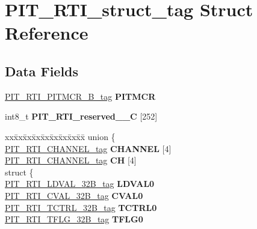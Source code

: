 \hypertarget{structPIT__RTI__struct__tag}{}\section{P\+I\+T\+\_\+\+R\+T\+I\+\_\+struct\+\_\+tag Struct Reference}
\label{structPIT__RTI__struct__tag}
\subsection*{Data Fields}
\begin{DoxyCompactItemize}
\item 
\mbox{\label{structPIT__RTI__struct__tag_a57e87d6540fea4c0d5953554ebdda89d}} 
\mbox{\hyperlink{unionPIT__RTI__PITMCR__32B__tag}{P\+I\+T\+\_\+\+R\+T\+I\+\_\+\+P\+I\+T\+M\+C\+R\+\_\+B\+\_\+tag}} {\bfseries P\+I\+T\+M\+CR}
\item 
\mbox{\label{structPIT__RTI__struct__tag_a6ff8f9b0ae852d101da16b78228c33b9}} 
int8\+\_\+t {\bfseries P\+I\+T\+\_\+\+R\+T\+I\+\_\+reserved\+\_\+\_\+C} \mbox{[}252\mbox{]}
\item 
\mbox{\label{structPIT__RTI__struct__tag_a1cb68ad21449772834486330bcc8e533}} 
\begin{tabbing}
xx\=xx\=xx\=xx\=xx\=xx\=xx\=xx\=xx\=\kill
union \{\\
\>\mbox{\hyperlink{structPIT__RTI__CHANNEL__struct__tag}{PIT\_RTI\_CHANNEL\_tag}} {\bfseries CHANNEL} \mbox{[}4\mbox{]}\\
\>\mbox{\hyperlink{structPIT__RTI__CHANNEL__struct__tag}{PIT\_RTI\_CHANNEL\_tag}} {\bfseries CH} \mbox{[}4\mbox{]}\\
\mbox{\label{unionPIT__RTI__struct__tag_1_1_0D1740_a6cdea62a5904fed77b8dd86c7295d783}} 
\>struct \{\\
\>\>\mbox{\hyperlink{unionPIT__RTI__LDVAL__32B__tag}{PIT\_RTI\_LDVAL\_32B\_tag}} {\bfseries LDVAL0}\\
\>\>\mbox{\hyperlink{unionPIT__RTI__CVAL__32B__tag}{PIT\_RTI\_CVAL\_32B\_tag}} {\bfseries CVAL0}\\
\>\>\mbox{\hyperlink{unionPIT__RTI__TCTRL__32B__tag}{PIT\_RTI\_TCTRL\_32B\_tag}} {\bfseries TCTRL0}\\
\>\>\mbox{\hyperlink{unionPIT__RTI__TFLG__32B__tag}{PIT\_RTI\_TFLG\_32B\_tag}} {\bfseries TFLG0}\\

\end{tabbing}
\end{DoxyCompactItemize}
